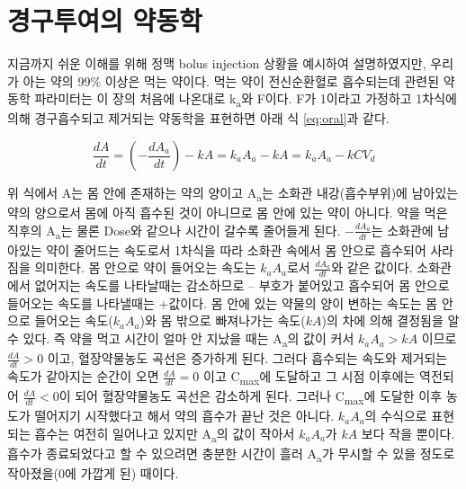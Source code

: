 \documentclass[
  11pt,
  krantz2, a4paper, twoside]{krantz}
\theoremstyle{definition}
\theoremstyle{definition}
\theoremstyle{definition}
\theoremstyle{definition}
\theoremstyle{remark}
\begin{document}
\hypertarget{uxacbduxad6cuxd22cuxc5ecuxc758-uxc57duxb3d9uxd559}{%
\section{\texorpdfstring{경구투여의 약동학}{경구투여의 약동학}}\label{uxacbduxad6cuxd22cuxc5ecuxc758-uxc57duxb3d9uxd559}}

지금까지 쉬운 이해를 위해 정맥 bolus injection 상황을 예시하여 설명하였지만, 우리가 아는 약의 99\% 이상은 먹는 약이다.
먹는 약이 전신순환혈로 흡수되는데 관련된 약동학 파라미터는 이 장의 처음에 나온대로 k\textsubscript{a}와 F이다. 
F가 1이라고 가정하고 1차식에 의해 경구흡수되고 제거되는 약동학을 표현하면 아래 식 \eqref{eq:oral}과 같다.

\begin{equation}
\frac{{dA}}{{dt}} = \left( - \frac{{dA}_{a}}{{dt}} \right) - kA = k_{a}A_{a} - kA = k_{a}A_{a} - kCV_{d}
\label{eq:oral}
\end{equation}

위 식에서 A는 몸 안에 존재하는 약의 양이고 A\textsubscript{a}는 소화관 내강(흡수부위)에 남아있는 약의 양으로서 몸에 아직 흡수된 것이 아니므로 몸 안에 있는 약이 아니다.
약을 먹은 직후의 A\textsubscript{a}는 물론 Dose와 같으나 시간이 갈수록 줄어들게 된다.
\(- \frac{{dA}_{a}}{{dt}}\)는 소화관에 남아있는 약이 줄어드는 속도로서 1차식을 따라 소화관 속에서 몸 안으로 흡수되어 사라짐을 의미한다.
몸 안으로 약이 들어오는 속도는 \(k_{a}A_{a}\)로서 \(\frac{{dA}_{a}}{{dt}}\)와 같은 값이다.
소화관에서 없어지는 속도를 나타날때는 감소하므로 -- 부호가 붙어있고 흡수되어 몸 안으로 들어오는 속도를 나타낼때는 +값이다. 몸 안에 있는
약물의 양이 변하는 속도는 몸 안으로 들어오는 속도(\(k_{a}A_{a}\))와 몸
밖으로 빠져나가는 속도(\({kA}\))의 차에 의해 결정됨을 알 수 있다. 즉
약을 먹고 시간이 얼마 안 지났을 때는 A\textsubscript{a}의 값이 커서 \(k_{a}A_{a} > kA\)
이므로 \(\frac{{dA}}{{dt}} > 0\) 이고, 혈장약물농도 곡선은
증가하게 된다. 그러다 흡수되는 속도와 제거되는 속도가 같아지는 순간이
오면 \(\frac{{dA}}{{dt}} = 0\) 이고 C\textsubscript{max}에 도달하고 그 시점
이후에는 역전되어 \(\frac{{dA}}{{dt}} < 0\)이 되어 혈장약물농도
곡선은 감소하게 된다. 그러나 C\textsubscript{max}에 도달한 이후 농도가 떨어지기
시작했다고 해서 약의 흡수가 끝난 것은 아니다. \(k_{a}A_{a}\)의 수식으로
표현되는 흡수는 여전히 일어나고 있지만 A\textsubscript{a}의 값이 작아서 \(k_{a}A_{a}\)가
\({kA}\) 보다 작을 뿐이다. 흡수가 종료되었다고 할 수 있으려면 충분한
시간이 흘러 A\textsubscript{a}가 무시할 수 있을 정도로 작아졌을(0에 가깝게 된) 때이다.
\end{document}
